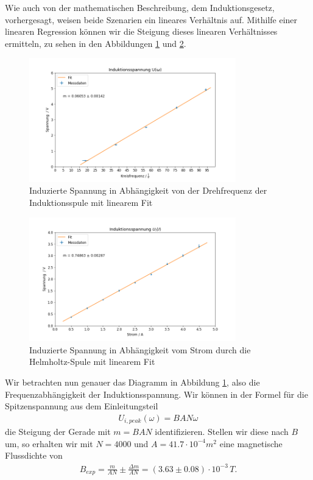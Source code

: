 Wie auch von der mathematischen Beschreibung, dem Induktionsgesetz, vorhergesagt, weisen beide Szenarien ein lineares Verhältnis auf. Mithilfe einer linearen Regression können wir die Steigung dieses linearen Verhältnisses ermitteln, zu sehen in den Abbildungen \ref{plot:ui_by_omega_fit} und \ref{plot:ui_by_i_fit}.

\begin{figure}[H]
    \centering
    \includegraphics[width=0.8\textwidth]{files/ui_by_omega_fit.png}
    \caption{Induzierte Spannung in Abhängigkeit von der Drehfrequenz der Induktionsspule mit linearem Fit}
    \label{plot:ui_by_omega_fit}
\end{figure}

\begin{figure}[H]
    \centering
    \includegraphics[width=0.8\textwidth]{files/ui_by_i_fit.png}
    \caption{Induzierte Spannung in Abhängigkeit vom Strom durch die Helmholtz-Spule mit linearem Fit}
    \label{plot:ui_by_i_fit}
\end{figure}

Wir betrachten nun genauer das Diagramm in Abbildung \ref{plot:ui_by_omega_fit}, also die Frequenzabhängigkeit der Induktionsspannung. Wir können in der Formel für die Spitzenspannung aus dem Einleitungsteil
\begin{align}
    U_{i,peak}(\omega) = B A N \omega
\end{align}
die Steigung der Gerade mit $m = BAN$ identifizieren. Stellen wir diese nach $B$ um, so erhalten wir mit $N = 4000$ und $A = 41.7 \cdot 10^{-4} \si{m^2}$ eine magnetische Flussdichte von
\begin{align}
    B_{exp} = \frac{m}{A N} \pm \frac{\Delta m}{A N} = (3.63 \pm 0.08) \cdot 10^{-3}\, \si{T}.
\end{align}

